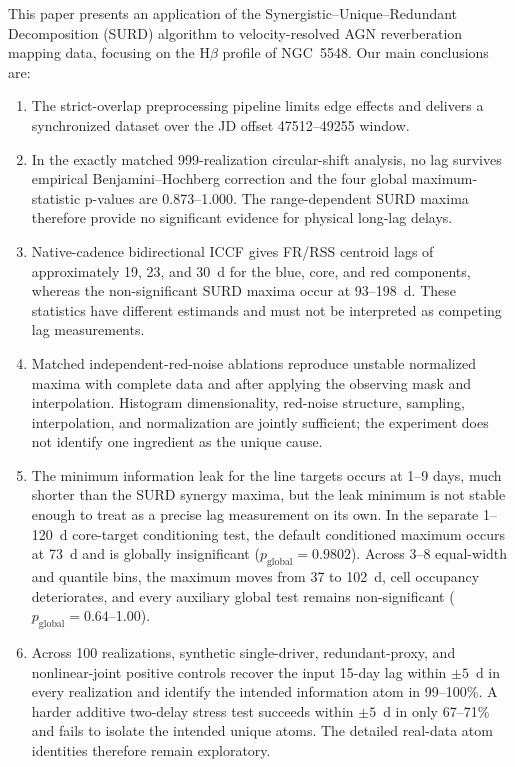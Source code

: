 \documentclass[fleqn,usenatbib]{mnras}
\begin{document}
This paper presents an application of the Synergistic--Unique--Redundant Decomposition (SURD) algorithm to velocity-resolved AGN reverberation mapping data, focusing on the H\(\beta\) profile of NGC~5548. Our main conclusions are:
\begin{enumerate}
\item The strict-overlap preprocessing pipeline limits edge effects and delivers a synchronized dataset over the JD offset 47512--49255 window.
\item In the exactly matched 999-realization circular-shift analysis, no lag survives empirical Benjamini--Hochberg correction and the four global maximum-statistic p-values are 0.873--1.000. The range-dependent SURD maxima therefore provide no significant evidence for physical long-lag delays.
\item Native-cadence bidirectional ICCF gives FR/RSS centroid lags of approximately 19, 23, and 30~d for the blue, core, and red components, whereas the non-significant SURD maxima occur at 93--198~d. These statistics have different estimands and must not be interpreted as competing lag measurements.
\item Matched independent-red-noise ablations reproduce unstable normalized maxima with complete data and after applying the observing mask and interpolation. Histogram dimensionality, red-noise structure, sampling, interpolation, and normalization are jointly sufficient; the experiment does not identify one ingredient as the unique cause.
\item The minimum information leak for the line targets occurs at 1--9 days, much shorter than the SURD synergy maxima, but the leak minimum is not stable enough to treat as a precise lag measurement on its own. In the separate 1--120~d core-target conditioning test, the default conditioned maximum occurs at 73~d and is globally insignificant ($p_{\mathrm{global}} = 0.9802$). Across 3--8 equal-width and quantile bins, the maximum moves from 37 to 102~d, cell occupancy deteriorates, and every auxiliary global test remains non-significant ($p_{\mathrm{global}}=0.64$--1.00).
\item Across 100 realizations, synthetic single-driver, redundant-proxy, and nonlinear-joint positive controls recover the input 15-day lag within $\pm5$~d in every realization and identify the intended information atom in 99--100\%. A harder additive two-delay stress test succeeds within $\pm5$~d in only 67--71\% and fails to isolate the intended unique atoms. The detailed real-data atom identities therefore remain exploratory.

\end{enumerate}
\end{document}
